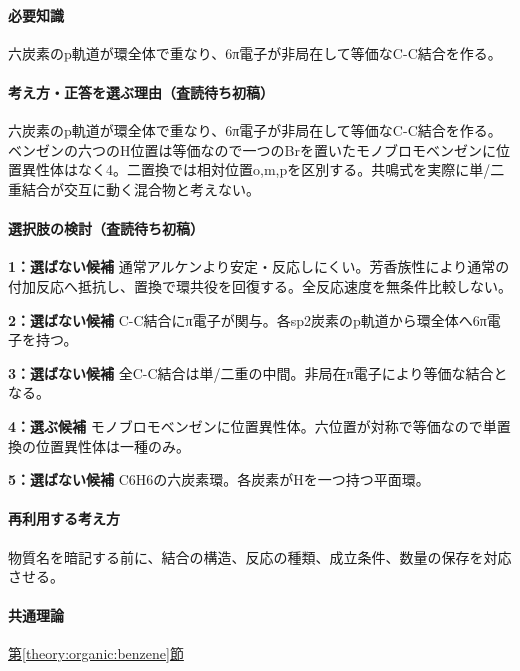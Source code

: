 \paragraph{必要知識} 六炭素のp軌道が環全体で重なり、6π電子が非局在して等価なC-C結合を作る。

\paragraph{考え方・正答を選ぶ理由（査読待ち初稿）} 六炭素のp軌道が環全体で重なり、6π電子が非局在して等価なC-C結合を作る。ベンゼンの六つのH位置は等価なので一つのBrを置いたモノブロモベンゼンに位置異性体はなく4。二置換では相対位置o,m,pを区別する。共鳴式を実際に単/二重結合が交互に動く混合物と考えない。

\paragraph{選択肢の検討（査読待ち初稿）}\mbox{}\par

\noindent\textbf{1：選ばない候補} 通常アルケンより安定・反応しにくい。芳香族性により通常の付加反応へ抵抗し、置換で環共役を回復する。全反応速度を無条件比較しない。\par

\noindent\textbf{2：選ばない候補} C-C結合にπ電子が関与。各sp2炭素のp軌道から環全体へ6π電子を持つ。\par

\noindent\textbf{3：選ばない候補} 全C-C結合は単/二重の中間。非局在π電子により等価な結合となる。\par

\noindent\textbf{4：選ぶ候補} モノブロモベンゼンに位置異性体。六位置が対称で等価なので単置換の位置異性体は一種のみ。\par

\noindent\textbf{5：選ばない候補} C6H6の六炭素環。各炭素がHを一つ持つ平面環。\par

\paragraph{再利用する考え方} 物質名を暗記する前に、結合の構造、反応の種類、成立条件、数量の保存を対応させる。

\paragraph{共通理論} \hyperref[theory:organic:benzene]{第\ref*{theory:organic:benzene}節}

